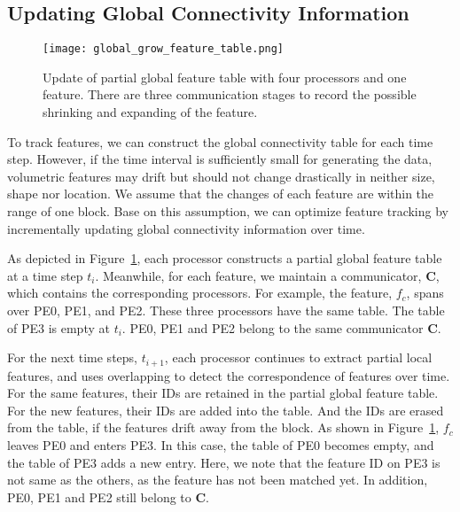 \subsection{Updating Global Connectivity Information}

\begin{figure}[t]
	\centering
	\texttt{[image: global\_grow\_feature\_table.png]}
	\caption{Update of partial global feature table with four processors and one feature. There are three communication stages to record the possible shrinking and expanding of the feature. }
	\label{fig:hybrid}
\end{figure}

To track features, we can construct the global connectivity table for each time step. However, if the time interval is sufficiently small for generating the data, volumetric features may drift but should not change drastically in neither size, shape nor location. We assume that the changes of each feature are within the range of one block. Base on this assumption, we can optimize feature tracking by incrementally updating global connectivity information over time.

As depicted in Figure~\ref{fig:hybrid}, each processor constructs a partial global feature table at a time step $t_i$. Meanwhile, for each feature, we maintain a communicator, $\textbf{C}$, which contains the corresponding processors. For example, the feature, $f_c$, spans over PE0, PE1, and PE2. These three processors have the same table. The table of PE3 is empty at $t_i$. PE0, PE1 and PE2 belong to the same communicator $\textbf{C}$.

For the next time steps, $t_{i+1}$, each processor continues to extract partial local features, and uses overlapping to detect the correspondence of features over time. For the same features, their IDs are retained in the partial global feature table. For the new features, their IDs are added into the table. And the IDs are erased from the table, if the features drift away from the block. As shown in Figure~\ref{fig:hybrid}, $f_c$ leaves PE0 and enters PE3. In this case, the table of PE0 becomes empty, and the table of PE3 adds a new entry. Here, we note that the feature ID on PE3 is not same as the others, as the feature has not been matched yet. In addition, PE0, PE1 and PE2 still belong to $\textbf{C}$. 

